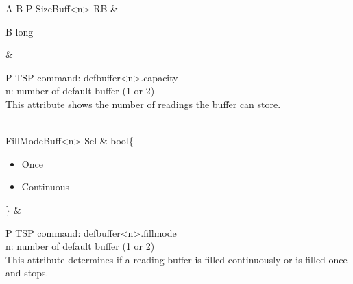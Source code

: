 \documentclass[openany]{article}
\begin{document}
\begin{longtable}{A B P}
		SizeBuff\textless n\textgreater-RB & \begin{tabular}{B}
					long
				\end{tabular} & 
				\begin{tabular}{P}
					TSP command: defbuffer\textless n\textgreater.capacity \\
					n: number of default buffer (1 or 2) \\
					This attribute shows the number of readings the buffer can store.
				\end{tabular} \\ \hline
		FillModeBuff\textless n\textgreater-Sel & bool\{\begin{itemize}[noitemsep]
					\small
					\item[] Once
					\item[] Continuous
				\end{itemize}\} & 
				\begin{tabular}{P}
					TSP command: defbuffer\textless n\textgreater.fillmode \\
					n: number of default buffer (1 or 2) \\
					This attribute determines if a reading buffer is filled continuously or is filled once and stops.
				\end{tabular} \\


\end{longtable}
\end{document}
